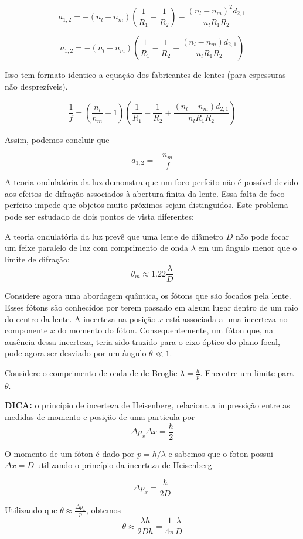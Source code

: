 \documentclass[11pt]{article}
\begin{document}
\begin{pproblem}
\begin{pssolution*}{}{}
        \[a_{1,2} = - (n_l-n_m)\left(\frac{1}{R_1}-\frac{1}{R_2}\right) - \frac{(n_l-n_m)^2 d_{2,1}}{n_lR_1R_2}\]

        \[a_{1,2} = -(n_l-n_m)\left(\frac{1}{R_1}-\frac{1}{R_2} + \frac{(n_l-n_m)d_{2,1}}{n_l R_1R_2}\right)\]

        Isso tem formato identico a equação dos fabricantes de lentes (para espessuras não desprezíveis). 

        \[\frac{1}{f} = \left(\frac{n_l}{n_m}-1\right)\left(\frac{1}{R_1}-\frac{1}{R_2} + \frac{(n_l-n_m)d_{2,1}}{n_l R_1R_2}\right)\]

        Assim, podemos concluir que

        \[\boxed{a_{1,2} = -\frac{n_m}{f}}\]

\end{pssolution*}

\end{pproblem}

\begin{pproblem}
    A teoria ondulatória da luz demonstra que um foco perfeito não é possível devido aos efeitos de difração associados à abertura finita da lente. Essa falta de foco perfeito impede que objetos muito próximos sejam distinguidos. Este problema pode ser estudado de dois pontos de vista diferentes:

    A teoria ondulatória da luz prevê que uma lente de diâmetro $D$ não pode focar um feixe paralelo de luz com comprimento de onda $\lambda$ em um ângulo menor que o limite de difração:
    \begin{equation}
        \theta_m \approx 1.22 \frac{\lambda}{D}
    \end{equation}

    Considere agora uma abordagem quântica, os fótons que são focados pela lente. Esses fótons são conhecidos por terem passado em algum lugar dentro de um raio do centro da lente. A incerteza na posição $x$ está associada a uma incerteza no componente $x$ do momento do fóton. Consequentemente, um fóton que, na ausência dessa incerteza, teria sido trazido para o eixo óptico do plano focal, pode agora ser desviado por um ângulo $\theta \ll 1$.

    Considere o comprimento de onda de de Broglie $\lambda = \frac{h}{p}$. Encontre um limite para $\theta$.

    \textbf{DICA:} o princípio de incerteza de Heisenberg, relaciona a impressição entre as medidas de momento e posição de uma particula por 
    \[\Delta p_x \Delta x = \frac{\hbar}{2}\]

\begin{pssolution*}{}{}
    O momento de um fóton é dado por \(p = h/\lambda\) e sabemos que o foton possui \(\Delta x = D\) utilizando o princípio da incerteza de Heisenberg

    \[\Delta p_x = \frac{\hbar}{2D}\]

    Utilizando que \(\theta \approx \frac{\Delta p_x}{p}\), obtemos
    \[\boxed{\theta \approx\frac{\lambda\hbar}{2D h} = \frac{1}{4\pi}\frac{\lambda}{D}}\]
\end{pssolution*}
\end{pproblem}
\end{document}
